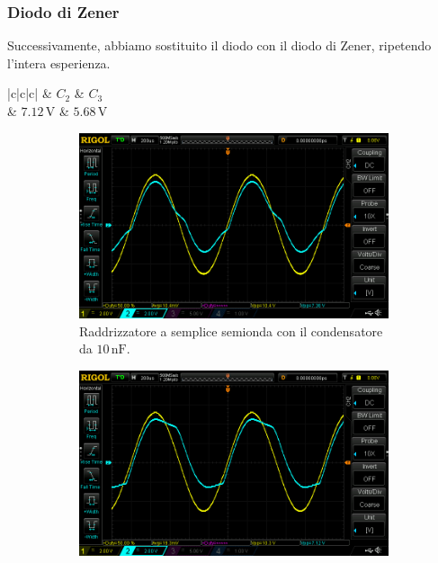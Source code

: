 \documentclass[a4paper]{article}
\begin{document}
			\subsubsection{Diodo di Zener}	
				Successivamente, abbiamo sostituito il diodo con il diodo di Zener, ripetendo l'intera esperienza.
				\begin{center}
					\begin{tabular}{ |c|c|c| }
						\hline
						 & \textbf{$ C_{2} $} & \textbf{$ C_{3} $} \\
						\hline
						 & $ 7.12 \, \mathrm{V} $ & $ 5.68 \, \mathrm{V} $ \\
						\hline
					\end{tabular}
				\end{center}
				\begin{figure}[h!]
					\centering
					\begin{subfigure}{0.4\textwidth}
						\centering
						\includegraphics[scale=0.2]{raddrizzatoreASempliceSemiondaDiodoDiZener10n}
						\caption{Raddrizzatore a semplice semionda con il condensatore da $ 10 \, \mathrm{nF} $.}
					\end{subfigure}
					\begin{subfigure}{0.4\textwidth}
						\centering
						\includegraphics[scale=0.2]{raddrizzatoreASempliceSemiondaDiodoDiZener100n}

\end{subfigure}
\end{figure}
\end{document}
